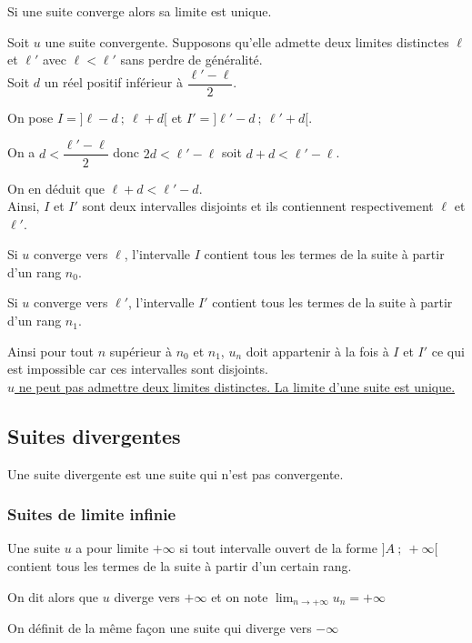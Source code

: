 \documentclass[french]{book}
\newcommand{\limn}{\lim_{n\rightarrow +\infty}}
\begin{document}
\vspace{2ex}
\begin{prop}
Si une suite converge alors sa limite est unique.
\end{prop}

\begin{demo}
Soit $u$ une suite convergente. Supposons qu'elle admette deux limites distinctes $\ell$ et $\ell'$ avec $\ell<\ell'$ sans perdre de généralité.\\

Soit $d$ un réel positif inférieur à $\dfrac{\ell'-\ell}{2}$.

On pose $I=]\ell-d~;~\ell+d[$ et $I'=]\ell'-d~;~\ell'+d[$.

On a $d<\dfrac{\ell'-\ell}{2}$ donc $2d<\ell'-\ell$ soit $d+d<\ell'-\ell$.

On en déduit que $\ell+d<\ell'-d$.\\

Ainsi, $I$ et $I'$ sont deux intervalles disjoints et ils contiennent respectivement $\ell$ et $\ell'$.

Si $u$ converge vers $\ell$, l'intervalle $I$ contient tous les termes de la suite à partir d'un rang $n_{0}$.

Si $u$ converge vers $\ell'$, l'intervalle $I'$ contient tous les termes de la suite à partir d'un rang $n_{1}$.

Ainsi pour tout $n$ supérieur à $n_{0}$ et $n_{1}$, $u_{n}$ doit appartenir à la fois à $I$ et $I'$ ce qui est impossible car ces intervalles sont disjoints. \\

\underline{ $u$ ne peut pas admettre deux limites distinctes. La limite d'une suite est unique.}
\end{demo}
\newpage

\subsection{Suites divergentes}
Une suite divergente est une suite qui n'est pas convergente.
\subsubsection*{Suites de limite infinie}
\begin{defn}
Une suite $u$ a pour limite $+\infty$ si tout intervalle ouvert de la forme $]A~;~+\infty[$ contient tous les termes de la suite à partir d'un certain rang.
\par On dit alors que $u$ diverge vers $+\infty$ et on note $\limn u_{n}=+\infty$
\par On définit de la même façon une suite qui diverge vers $-\infty$
\end{defn}
\end{document}
